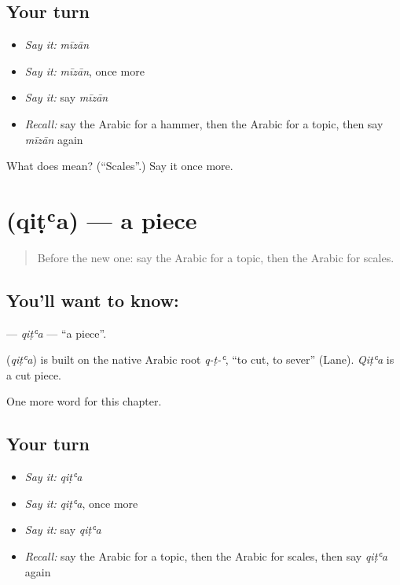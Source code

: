 \subsection*{Your turn}
\begin{itemize}
\raggedright
  \item \emph{Say it:} \emph{mīzān}
  \item \emph{Say it:} \emph{mīzān}, once more
  \item \emph{Say it:} say \emph{mīzān}
  \item \emph{Recall:} say the Arabic for a hammer, then the Arabic for a topic, then say \emph{mīzān} again
\end{itemize}

\begin{tcolorbox}[breakable,colback=teal!4,colframe=teal!35!black,title={Before you move on}]
What does  mean? (\textquotedblleft{}Scales\textquotedblright{}.) Say it once more.
\end{tcolorbox}
\section[\texorpdfstring{\ar{قطعة} (qiṭʿa)}{قطعة (qiṭʿa)}]{ (qiṭʿa) — a piece}

\label{lesson:AR-C218-qita}



\begin{quote}
Before the new one: say the Arabic for a topic, then the Arabic for scales.
\end{quote}

\subsection*{You'll want to know: }
\textbf{} — \emph{qiṭʿa} — \textquotedblleft{}a piece\textquotedblright{}.

\begin{cousinweb}
\textbf{} (\emph{qiṭʿa}) is built on the native Arabic root \emph{q-ṭ-ʿ}, \textquotedblleft{}to cut, to sever\textquotedblright{} (Lane). \emph{Qiṭʿa} is a cut piece.
\end{cousinweb}

\begin{grammarlens}[title={What you've built}]
One more word for this chapter.
\end{grammarlens}

\subsection*{Your turn}
\begin{itemize}
\raggedright
  \item \emph{Say it:} \emph{qiṭʿa}
  \item \emph{Say it:} \emph{qiṭʿa}, once more
  \item \emph{Say it:} say \emph{qiṭʿa}
  \item \emph{Recall:} say the Arabic for a topic, then the Arabic for scales, then say \emph{qiṭʿa} again
\end{itemize}

